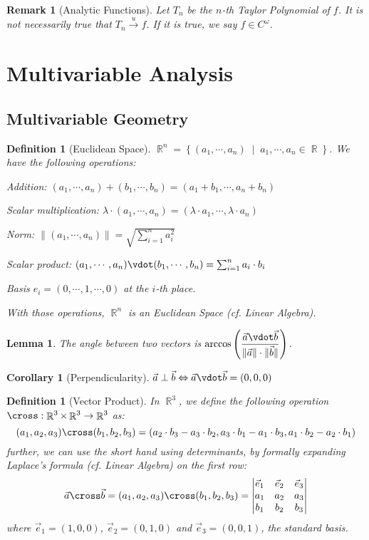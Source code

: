 \documentclass[12pt]{article}
\let\LR\Leftrightarrow
\newcommand{\set}[2]{\left\{{#1}\;\middle|\;{#2}\right\}}
\DeclareMathOperator{\R}{\mathbb{R}}
\newcommand{\uto}[0]{\overset{\displaystyle u}{\longrightarrow}}
\newtheorem{definition}[theorem]{Definition}
\newtheorem{lemma}[theorem]{Lemma}
\newtheorem{corollary}[theorem]{Corollary}
\newtheorem{remark}[theorem]{Remark}
\begin{document}
\begin{remark}[Analytic Functions]
  Let $T_n$ be the $n$-th Taylor Polynomial of $f$. It is not necessarily true that $T_n\uto f$. If it is true, we say $f\in C^\omega$.
\end{remark}

\pagebreak

\section{Multivariable Analysis}

\subsection{Multivariable Geometry}

\begin{definition}[Euclidean Space]
  \label{Euclidean}
  $\R^n=\set{(a_1,\cdots,a_n)}{a_1,\cdots,a_n\in\R}$. We have the following operations:
  \begin{compactitem}
    \item[] Addition: $(a_1,\cdots,a_n)+(b_1,\cdots,b_n)=(a_1+b_1,\cdots,a_n+b_n)$
    \item[] Scalar multiplication: $\lambda\cdot(a_1,\cdots,a_n)=(\lambda\cdot a_1,\cdots,\lambda\cdot a_n)$
    \item[] Norm: $\|(a_1,\cdots,a_n)\|=\sqrt{\sum_{i=1}^n a_i^2}$
    \item[] Scalar product: $(a_1,\cdots,a_n)\vdot(b_1,\cdots,b_n)=\sum_{i=1}^n a_i\cdot b_i$
    \item[] Basis $e_i=(0,\cdots,1,\cdots,0)$ at the $i$-th place.
  \end{compactitem}
  With those operations, $\R^n$ is an Euclidean Space (cf. Linear Algebra).
\end{definition}

\begin{lemma}
  The angle between two vectors is $\arccos\left(\dfrac{\vec{a}\vdot \vec{b}}{\|\vec{a}\|\cdot\|\vec{b}\|}\right)$.
\end{lemma}

\begin{corollary}[Perpendicularity]
  $\vec{a}\perp \vec{b}\LR \vec{a}\vdot \vec{b}=(0,0,0)$
\end{corollary}

\begin{definition}[Vector Product]
  \label{def_cross}
  In $\R^3$, we define the following operation $\cross:\R^3\times\R^3\to\R^3$ as: $$(a_1,a_2,a_3)\cross(b_1,b_2,b_3)=(a_2\cdot b_3-a_3\cdot b_2, a_3\cdot b_1-a_1\cdot b_3,a_1\cdot b_2-a_2\cdot b_1)$$
  further, we can use the short hand using determinants, by formally expanding Laplace's formula (cf. Linear Algebra) on the first row: $$\vec{a}\cross\vec{b}=(a_1,a_2,a_3)\cross(b_1,b_2,b_3)=\begin{vmatrix}
    \vec{e}_1 & \vec{e}_2 & \vec{e}_3 \\
    a_1 & a_2 & a_3 \\
    b_1 & b_2 & b_3
  \end{vmatrix}$$ where $\vec{e}_1=(1,0,0)$, $\vec{e}_2=(0,1,0)$ and $\vec{e}_3=(0,0,1)$, the standard basis.
\end{definition}
\end{document}
